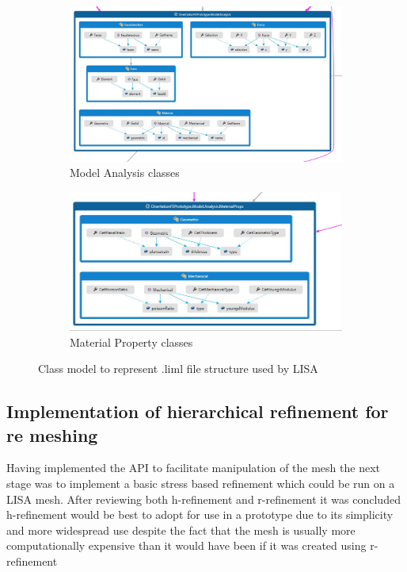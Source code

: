 \documentclass{article}
\begin{document}
\begin{figure}
\centering
\begin{subfigure}{.5\textwidth}
  \centering
  \includegraphics[width=0.9\linewidth]{DissoFEProto-ModelAnalysis.jpg}
  \caption{Model Analysis classes}
  \label{fig:sub1}
\end{subfigure}%
\begin{subfigure}{.5\textwidth}
  \centering
  \includegraphics[width=0.9\linewidth]{DissoFEProto-MaterialProps.jpg}
  \caption{Material Property classes}
  \label{fig:sub2}
\end{subfigure}
\label{fig:test}
\caption{Class model to represent .liml file structure used by LISA}
\end{figure}

\newpage
\subsection{Implementation of hierarchical refinement for re meshing}
Having implemented the API to facilitate manipulation of the mesh the next stage was to implement a basic stress based refinement which could be run on a LISA mesh. After reviewing both h-refinement \cite{HandPRefinements} and r-refinement \cite{RRefinement} it was concluded h-refinement would be best to adopt for use in a prototype due to its simplicity and more widespread use \cite{HandPRefinements} despite the fact that the mesh is usually more computationally expensive than it would have been if it was created using r-refinement \cite{RRefinement}\\ 
\end{document}

